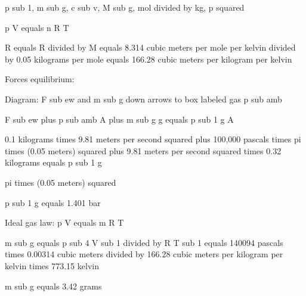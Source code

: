p sub 1, m sub g, c sub v, M sub g, mol divided by kg, p squared

p V equals n R T

R equals R divided by M equals 8.314 cubic meters per mole per kelvin divided by 0.05 kilograms per mole equals 166.28 cubic meters per kilogram per kelvin

Forces equilibrium:

Diagram: F sub ew and m sub g down arrows to box labeled gas p sub amb

F sub ew plus p sub amb A plus m sub g g equals p sub 1 g A

0.1 kilograms times 9.81 meters per second squared plus 100,000 pascals times pi times (0.05 meters) squared plus 9.81 meters per second squared times 0.32 kilograms equals p sub 1 g

pi times (0.05 meters) squared

p sub 1 g equals 1.401 bar

Ideal gas law: p V equals m R T

m sub g equals p sub 4 V sub 1 divided by R T sub 1 equals 140094 pascals times 0.00314 cubic meters divided by 166.28 cubic meters per kilogram per kelvin times 773.15 kelvin

m sub g equals 3.42 grams